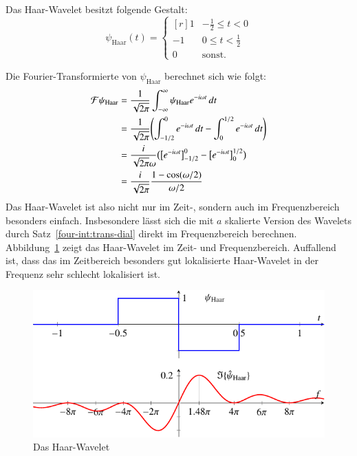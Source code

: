 \begin{definition}
	\label{complex:def-haar-wavelet}
	Das Haar-Wavelet besitzt folgende Gestalt:
	\[
	\psi_{\text{Haar}}(t) = \left\lbrace\begin{matrix*}[r]
	1 & -\frac{1}{2} \le t < 0  \\
	-1 & 0 \le t < \frac{1}{2} \\
	0 & \text{sonst}.
	\end{matrix*} \right.\label{complex:def-haar}
	\]
\end{definition}
Die Fourier-Transformierte von $\psi_{\text{Haar}}$ berechnet sich wie folgt:
\begin{align}
	\Four \psi_\text{Haar}  
	&= \frac{1}{\sqrt{2\pi}}\int_{-\infty}^{\infty} \psi_\text{Haar} e^{-i\omega t} \,dt\nonumber\\
	&= \frac{1}{\sqrt{2\pi}}\Biggl( \int_{-1/2}^{0} e^{-i\omega t} \,dt - \int_{0}^{1/2} e^{-i\omega t}\,dt \Biggr) \nonumber\\
	&= \frac{i}{\sqrt{2\pi}\omega}\bigl( \bigl[ e^{-i\omega t}\bigr]_{-1/2}^0  - \bigl[ e^{-i\omega t}\bigr]_{0}^{1/2} \bigr)\nonumber\\
	&= \frac{i}{\sqrt{2\pi}} \frac{1-\cos(\omega/2)}{\omega/2}\label{complex:f-psi-haar}
\end{align}
Das Haar-Wavelet ist also nicht nur im Zeit-, sondern auch im Frequenzbereich besonders einfach.
Insbesondere lässt sich die mit $a$ skalierte Version des Wavelets durch Satz~\ref{four-int:trans-dial} direkt im Frequenzbereich berechnen.
Abbildung~\ref{complex:haar} zeigt das Haar-Wavelet im Zeit- und Frequenzbereich.
Auffallend ist, dass das im Zeitbereich besonders gut lokalisierte Haar-Wavelet in der Frequenz sehr schlecht lokalisiert ist.
\begin{figure}
	\centering
	\includegraphics{papers/complex/images/haar.pdf}
	\caption{Das Haar-Wavelet}
	\label{complex:haar}
\end{figure}

